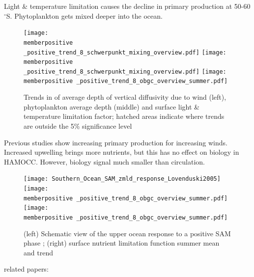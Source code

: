 \documentclass[aspectratio=169]{beamer}
\newcommand{\memberpositive}{m178_1985_1992} %
\begin{document}
\begin{frame}{Light \& temperature limitation causes the decline in primary production at 50-60$^\circ$S. Phytoplankton gets mixed deeper into the ocean.} %
	\begin{figure}
		\centering
		\texttt{[image: \\memberpositive \_positive\_trend\_8\_schwerpunkt\_mixing\_overview.pdf]} %
	\texttt{[image: \\memberpositive \_positive\_trend\_8\_schwerpunkt\_mixing\_overview.pdf]} %
		\texttt{[image: \\memberpositive \_positive\_trend\_8\_obgc\_overview\_summer.pdf]} %

\caption{Trends in of average depth of vertical diffusivity due to wind (left), phytoplankton average depth (middle) and surface light \& temperature limitation factor; hatched areas indicate where trends are outside the 5\% significance level}
\label{fig:wind_mixing}
	\end{figure}
	
\end{frame}



\begin{frame}{Previous studies show increasing primary production for increasing winds. Increased upwelling brings more nutrients, but this has no effect on biology in HAMOCC. However, biology signal much smaller than circulation.}
\begin{figure}
\centering
\vspace{-.5cm}
\texttt{[image: Southern\_Ocean\_SAM\_zmld\_response\_Lovenduski2005]}
\texttt{[image: \\memberpositive \_positive\_trend\_8\_obgc\_overview\_summer.pdf]} %
\texttt{[image: \\memberpositive \_positive\_trend\_8\_obgc\_overview\_summer.pdf]} %
\caption{(left) Schematic view of the upper ocean
response to a positive SAM phase \citep{Lovenduski2005}; (right) surface nutrient limitation function summer mean and trend} 
\end{figure}
\vspace{-3mm}
related papers: \citep{Lovenduski2008} \citep{wang2012} \citep{Hauck2013} 
\end{frame}
\end{document}
